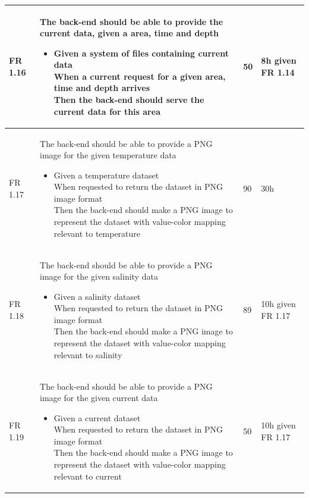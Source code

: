 \documentclass[11pt,a4paper,titlepage,oneside]{report}
\begin{document}
\begin{longtable}{p{1.4cm} p{7.8cm} p{1cm} p{1cm} }
  FR 1.16 & The back-end should be able to provide the current data, given a area, time and depth
  \begin{itemize}
  \item \parbox[t]{6.8cm}{
        Given a system of files containing current data \\
        When a current request for a given area, time and depth arrives \\
        Then the back-end should serve the current data for this area}
  \end{itemize}
  & 50 & 8h given FR 1.14 \\ \hline

  FR 1.17 & The back-end should be able to provide a \gls{PNG} image for the given temperature data
  \begin{itemize}
  \item \parbox[t]{6.8cm}{
        Given a temperature dataset \\
        When requested to return the dataset in \gls{PNG} image format \\
        Then the back-end should make a \gls{PNG} image to represent the dataset with value-color mapping relevant to temperature}
  \end{itemize}
  & 90 & 30h \\ \hline

  FR 1.18 & The back-end should be able to provide a \gls{PNG} image for the given salinity data
  \begin{itemize}
  \item \parbox[t]{6.8cm}{
        Given a salinity dataset \\
        When requested to return the dataset in \gls{PNG} image format \\
        Then the back-end should make a \gls{PNG} image to represent the dataset with value-color mapping relevant to salinity}
  \end{itemize}
  & 89 & 10h given FR 1.17 \\ \hline

  FR 1.19 & The back-end should be able to provide a \gls{PNG} image for the given current data
  \begin{itemize}
  \item \parbox[t]{6.8cm}{
        Given a current dataset \\
        When requested to return the dataset in \gls{PNG} image format \\
        Then the back-end should make a \gls{PNG} image to represent the dataset with value-color mapping relevant to current}
  \end{itemize}
  & 50 & 10h given FR 1.17  \\ \hline


\end{longtable}
\end{document}
